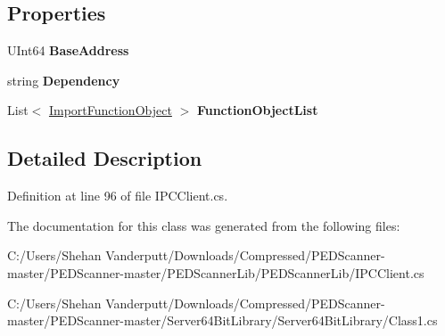 \subsection*{Properties}
\begin{DoxyCompactItemize}
\item 
\mbox{\label{class_objects_1_1_import_function_object_af58404b027a813c86ca174a3164ca62d}} 
U\+Int64 {\bfseries Base\+Address}
\item 
\mbox{\label{class_objects_1_1_import_function_object_acf76bad1d75d6eb65b117d3539279c4b}} 
string {\bfseries Dependency}
\item 
\mbox{\label{class_objects_1_1_import_function_object_a0a94ff959aa1e6fd4a7a64ee0936756a}} 
List$<$ \mbox{\hyperlink{class_objects_1_1_import_function_object}{Import\+Function\+Object}} $>$ {\bfseries Function\+Object\+List}
\end{DoxyCompactItemize}


\subsection{Detailed Description}


Definition at line 96 of file I\+P\+C\+Client.\+cs.



The documentation for this class was generated from the following files\+:\begin{DoxyCompactItemize}
\item 
C\+:/\+Users/\+Shehan Vanderputt/\+Downloads/\+Compressed/\+P\+E\+D\+Scanner-\/master/\+P\+E\+D\+Scanner-\/master/\+P\+E\+D\+Scanner\+Lib/\+P\+E\+D\+Scanner\+Lib/I\+P\+C\+Client.\+cs\item 
C\+:/\+Users/\+Shehan Vanderputt/\+Downloads/\+Compressed/\+P\+E\+D\+Scanner-\/master/\+P\+E\+D\+Scanner-\/master/\+Server64\+Bit\+Library/\+Server64\+Bit\+Library/Class1.\+cs\end{DoxyCompactItemize}
